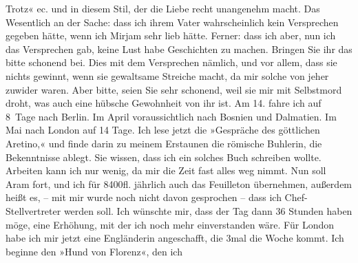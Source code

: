 \begin{ledgroupsized}[t]{13cm}
               Trotz« ec. und in diesem Stil, der die Liebe recht unangenehm macht. \pend
           \pstart
           Das Wesentlich an der Sache: dass ich ihrem Vater wahrscheinlich kein Versprechen gegeben hätte, wenn
               ich Mirjam sehr lieb hätte. Ferner: dass ich
               aber, nun ich das Versprechen gab, keine Lust habe Geschichten zu machen. Bringen Sie
               ihr das bitte schonend bei. Dies mit dem Versprechen nämlich, und vor allem, dass sie
               nichts gewinnt, wenn sie gewaltsame Streiche macht, da mir solche von jeher zuwider
               waren. Aber bitte, seien Sie sehr schonend, weil sie mir mit Selbstmord droht, was
               auch eine hübsche Gewohnheit von ihr ist. \pend
           \pstart
           Am 14. fahre ich auf 8 Tage nach Berlin. Im April voraussichtlich nach Bosnien und Dalmatien. Im Mai nach
               London auf 14 Tage. \pend
           \pstart
           {\pb}Ich lese jetzt die »Gespräche des göttlichen Aretino,« und finde
               darin zu meinem Erstaunen die römische Buhlerin, die Bekenntnisse ablegt. Sie wissen,
               dass ich ein solches Buch schreiben wollte. Arbeiten kann ich nur wenig, da mir die
               Zeit fast alles weg nimmt. \pend
           \pstart
           Nun soll Aram fort, und ich für 8400fl.
               jährlich auch das Feuilleton übernehmen, außerdem heißt es, – mit mir wurde noch
               nicht davon gesprochen – dass ich Chef-Stellvertreter werden soll. Ich wünschte mir,
               dass der Tag dann 36 Stunden haben möge, eine Erhöhung, mit der ich noch mehr
               einverstanden wäre. Für London habe ich mir jetzt eine
               Engländerin angeschafft, die 3mal
               die Woche kommt. Ich beginne den »Hund {\pb}von Florenz«, den ich

\end{ledgroupsized}
